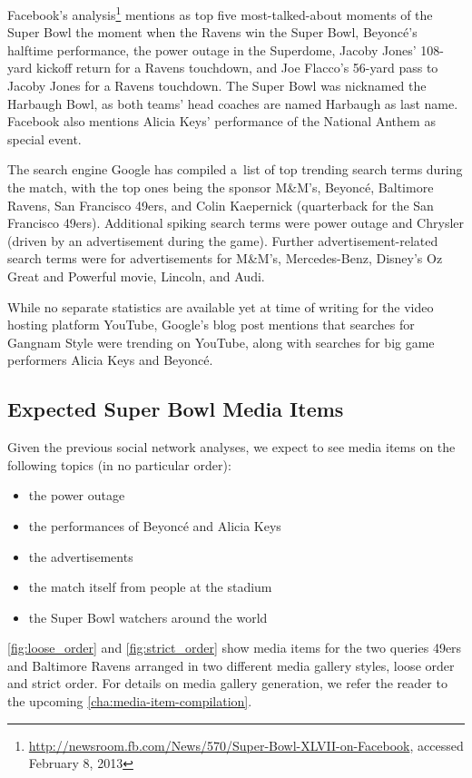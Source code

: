 Facebook's analysis\footnote{\url{http://newsroom.fb.com/News/570/Super-Bowl-XLVII-on-Facebook},
accessed February 8, 2013}
mentions as top five most-talked-about moments of the Super Bowl 
the moment when the Ravens win the Super Bowl, 
Beyoncé's halftime performance,
the power outage in the Superdome,
Jacoby Jones' 108-yard kickoff return for a Ravens touchdown, and
Joe Flacco’s 56-yard pass to Jacoby Jones for a Ravens touchdown.
The Super Bowl was nicknamed the Harbaugh Bowl, as both teams' head coaches
are named Harbaugh as last name.
Facebook also mentions Alicia Keys' performance of the National Anthem as special event.

The search engine Google has compiled a~list of top trending search terms
during the match, with the top ones being the sponsor M\&M's, Beyoncé, Baltimore Ravens,
San Francisco 49ers, and Colin Kaepernick (quarterback for the San Francisco 49ers).
Additional spiking search terms were power outage
and Chrysler (driven by an advertisement during the game).
Further advertisement-related search terms were for advertisements for M\&M's,
Mercedes-Benz, Disney’s Oz Great and Powerful movie, Lincoln, and Audi.

While no separate statistics are available yet at time of writing
for the video hosting platform YouTube,
Google's blog post mentions that searches for Gangnam Style were trending on YouTube,
along with searches for big game performers Alicia Keys and Beyoncé.

\subsection{Expected Super Bowl Media Items}

Given the previous social network analyses, we expect to see media items
on the following topics (in no particular order):

\begin{itemize}
  \itemsep0em
  \item the power outage
  \item the performances of Beyoncé and Alicia Keys
  \item the advertisements
  \item the match itself from people at the stadium
  \item the Super Bowl watchers around the world 
\end{itemize}

\autoref{fig:loose_order} and \autoref{fig:strict_order} show media items
for the two queries 49ers and Baltimore Ravens arranged
in two different media gallery styles, loose order and strict order.
For details on media gallery generation, we refer the reader to the upcoming
\autoref{cha:media-item-compilation}.

